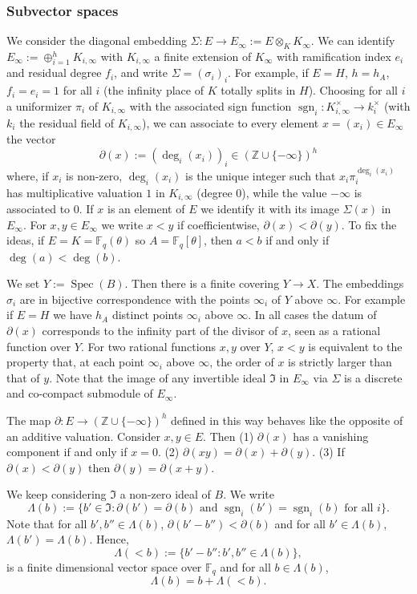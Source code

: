 \documentclass[11pt]{amsart}
\numberwithin{equation}{section}
\newcommand{\ZZ}{\mathbb{Z}}
\newcommand{\FF}{\mathbb{F}}
\newcommand{\sgn}{\operatorname{sgn}}
\begin{document}
\subsubsection*{Subvector spaces} We consider the diagonal embedding $\Sigma:E\rightarrow E_\infty:=E\otimes_{K}K_\infty$.
We can identify $E_\infty:=\oplus_{i=1}^h K_{i,\infty}$ with $K_{i,\infty}$ a finite extension of $K_\infty$ with ramification index $e_i$ and residual degree $f_i$, and write $\Sigma=(\sigma_i)_i$. For example, if $E=H$, $h=h_A$, $f_i=e_i=1$ for all $i$ (the infinity place of $K$ totally splits in $H$).
Choosing for all $i$ a uniformizer $\pi_i$ of $K_{i,\infty}$ with the associated sign function $\sgn_i:K_{i,\infty}^\times\rightarrow k_i^\times$ (with $k_i$ the residual field of $K_{i,\infty}$), we can associate to 
every element $x=(x_i)\in E_\infty$ the vector $$\partial(x):=(\deg_i(x_i))_i\in(\ZZ\cup\{-\infty\})^h$$ where, if
$x_i$ is non-zero, $\deg_i(x_i)$ is the unique integer such that $x_i\pi_i^{\deg_i(x_i)}$ has multiplicative valuation $1$ in $K_{i,\infty}$ (degree $0$), while the value $-\infty$ is associated to $0$. If $x$ is an element of $E$ we identify it with 
its image $\Sigma(x)$ in $E_\infty$.
For $x,y\in E_\infty$ we write $x<y$ if coefficientwise, $\partial(x)<\partial(y)$. To fix the ideas, if $E=K=\FF_q(\theta)$ so
$A=\FF_q[\theta]$, then $a<b$ if and only if $\deg(a)<\deg(b)$.

We set $Y:=\operatorname{Spec}(B)$. Then there is a finite covering 
$Y\rightarrow X$. The embeddings $\sigma_i$ are in bijective correspondence with the points $\infty_i$ of $Y$ above $\infty$. For example if $E=H$ we have $h_A$ distinct points $\infty_i$ above $\infty$. In all cases the datum of $\partial(x)$ corresponds to the infinity part of the divisor of $x$, seen as a rational function over $Y$.
For two rational functions $x,y$ over $Y$, $x<y$ is equivalent to the property that, at each point $\infty_i$ above $\infty$, the order of $x$ is strictly larger than that of $y$.
Note that the image of any invertible ideal $\mathfrak{I}$ in $E_\infty$ via $\Sigma$ is a discrete and co-compact submodule
of $E_\infty$.

The map $\partial: E\rightarrow(\ZZ\cup\{-\infty\})^h$ defined in this way behaves like the opposite of an additive valuation. Consider $x,y\in E$. Then (1) $\partial(x)$ has a vanishing component if and only if $x=0$. (2) $\partial(xy)=\partial(x)+\partial(y)$. (3) If $\partial(x)<\partial(y)$ then $\partial(y)=\partial(x+y)$.

We keep considering $\mathfrak{I}$ a non-zero ideal of $B$. We write
$$\Lambda(b):=\{b'\in\mathfrak{I}:\partial(b')=\partial(b)\text{ and }\sgn_i(b')=\sgn_i(b)\text{ for all $i$}\}.$$
Note that for all $b',b''\in\Lambda(b)$, $\partial(b'-b'')<\partial(b)$ and for all $b'\in \Lambda(b)$, $\Lambda(b')=\Lambda(b)$. Hence, $$\Lambda(<b):=\{b'-b'':b',b''\in\Lambda(b)\},$$ is a finite dimensional vector space over $\FF_q$ and for all $b\in \Lambda(b)$, 
$$\Lambda(b)=b+\Lambda(<b).$$
\end{document}
